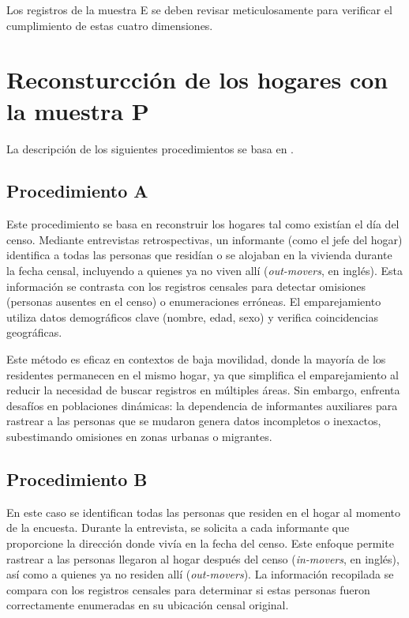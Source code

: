 \documentclass[
  12pt,
]{book}
\begin{document}
Los registros de la muestra E se deben revisar meticulosamente para verificar el cumplimiento de estas cuatro dimensiones.

\hypertarget{reconsturcciuxf3n-de-los-hogares-con-la-muestra-p}{%
\section{Reconsturcción de los hogares con la muestra P}\label{reconsturcciuxf3n-de-los-hogares-con-la-muestra-p}}

La descripción de los siguientes procedimientos se basa en \citet{UnitedNations_2010}.

\hypertarget{procedimiento-a}{%
\subsection{Procedimiento A}\label{procedimiento-a}}

Este procedimiento se basa en reconstruir los hogares tal como existían el día del censo. Mediante entrevistas retrospectivas, un informante (como el jefe del hogar) identifica a todas las personas que residían o se alojaban en la vivienda durante la fecha censal, incluyendo a quienes ya no viven allí (\emph{out-movers}, en inglés). Esta información se contrasta con los registros censales para detectar omisiones (personas ausentes en el censo) o enumeraciones erróneas. El emparejamiento utiliza datos demográficos clave (nombre, edad, sexo) y verifica coincidencias geográficas.

Este método es eficaz en contextos de baja movilidad, donde la mayoría de los residentes permanecen en el mismo hogar, ya que simplifica el emparejamiento al reducir la necesidad de buscar registros en múltiples áreas. Sin embargo, enfrenta desafíos en poblaciones dinámicas: la dependencia de informantes auxiliares para rastrear a las personas que se mudaron genera datos incompletos o inexactos, subestimando omisiones en zonas urbanas o migrantes.

\hypertarget{procedimiento-b}{%
\subsection{Procedimiento B}\label{procedimiento-b}}

En este caso se identifican todas las personas que residen en el hogar al momento de la encuesta. Durante la entrevista, se solicita a cada informante que proporcione la dirección donde vivía en la fecha del censo. Este enfoque permite rastrear a las personas llegaron al hogar después del censo (\emph{in-movers}, en inglés), así como a quienes ya no residen allí (\emph{out-movers}). La información recopilada se compara con los registros censales para determinar si estas personas fueron correctamente enumeradas en su ubicación censal original.
\end{document}

